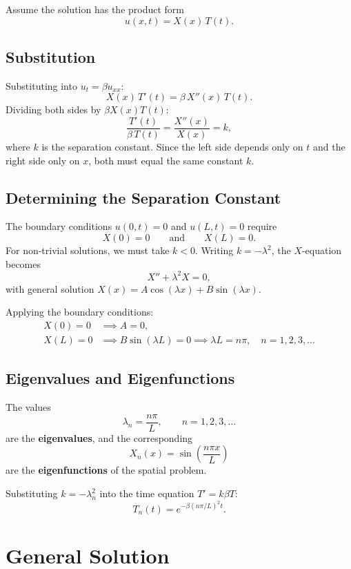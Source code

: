 Assume the solution has the product form
\[
  u(x,t) = X(x)\,T(t).
\]

\subsection{Substitution}

Substituting into $u_t = \beta u_{xx}$:
\[
  X(x)\,T'(t) = \beta\, X''(x)\,T(t).
\]
Dividing both sides by $\beta X(x)T(t)$:
\[
  \frac{T'(t)}{\beta\, T(t)} = \frac{X''(x)}{X(x)} = k,
\]
where $k$ is the separation constant. Since the left side depends only on $t$ and the right side only on $x$, both must equal the same constant $k$.

\subsection{Determining the Separation Constant}

The boundary conditions $u(0,t)=0$ and $u(L,t)=0$ require
\[
  X(0) = 0 \qquad\text{and}\qquad X(L) = 0.
\]
For non-trivial solutions, we must take $k < 0$. Writing $k = -\lambda^2$, the $X$-equation becomes
\[
  X'' + \lambda^2 X = 0,
\]
with general solution $X(x) = A\cos(\lambda x) + B\sin(\lambda x)$.

Applying the boundary conditions:
\begin{align*}
  X(0) = 0 &\implies A = 0, \\
  X(L) = 0 &\implies B\sin(\lambda L) = 0 \implies \lambda L = n\pi,\quad n = 1,2,3,\ldots
\end{align*}

\subsection{Eigenvalues and Eigenfunctions}

\begin{definition}
The values
\[
  \lambda_n = \frac{n\pi}{L}, \qquad n = 1, 2, 3, \ldots
\]
are the \textbf{eigenvalues}, and the corresponding
\[
  X_n(x) = \sin\!\left(\frac{n\pi x}{L}\right)
\]
are the \textbf{eigenfunctions} of the spatial problem.
\end{definition}

Substituting $k = -\lambda_n^2$ into the time equation $T' = k\beta T$:
\[
  T_n(t) = e^{-\beta\left(n\pi/L\right)^2 t}.
\]

\section{General Solution}

